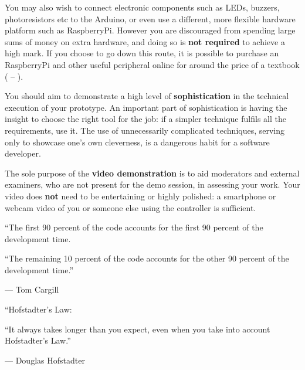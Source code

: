 \documentclass{../fal_assignment}
\begin{document}
You may also wish to connect electronic components such as LEDs, buzzers, photoresistors etc to the Arduino,
or even use a different, more flexible hardware platform such as RaspberryPi.
However you are discouraged from spending large sums of money on extra hardware,
and doing so is \textbf{not required} to achieve a high mark.
If you choose to go down this route,
it is possible to purchase an RaspberryPi and other useful peripheral online for 
around the price of a textbook ( -- ).

You should aim to demonstrate a high level of \textbf{sophistication}
in the technical execution of your prototype.
An important part of sophistication is having the insight to choose the right tool for the job:
if a simpler technique fulfils all the requirements, use it.
The use of unnecessarily complicated techniques, serving only to showcase one's own cleverness,
is a dangerous habit for a software developer.

The sole purpose of the \textbf{video demonstration} is to aid moderators and external examiners,
who are not present for the demo session,
in assessing your work.
Your video does \textbf{not} need to be entertaining or highly polished:
a smartphone or webcam video of you or someone else using the controller is sufficient.

%

\begin{marginquote}
    ``The first 90 percent of the code accounts for the first 90 percent of the development time.
    
    ``The remaining 10 percent of the code accounts for the other 90 percent of the development time.''
    
    --- Tom Cargill
    
    \marginquoterule
    
    ``Hofstadter's Law:
    
    ``It always takes longer than you expect, even when you take into account Hofstadter's Law.''
    
    --- Douglas Hofstadter
\end{marginquote}
\end{document}
